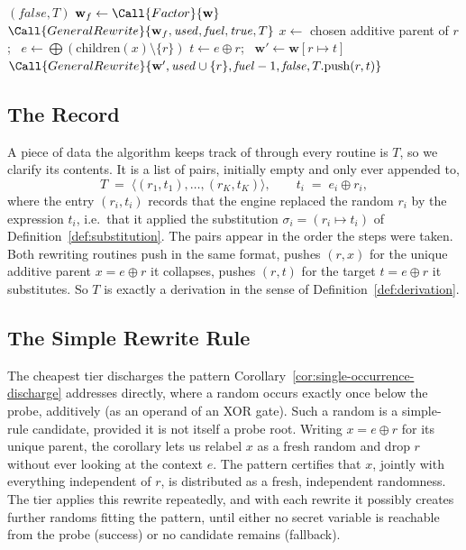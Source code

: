 \begin{algorithm}
\begin{minipage}{\linewidth}
\begin{algorithmic}[1]
     \Return $(\mathit{false}, T)$ \EndIf
    \State $\mathbf{w}_f \gets \Call{Factor}{\mathbf{w}}$ 
    \State \Return $\Call{GeneralRewrite}{\mathbf{w}_f, \mathit{used}, \mathit{fuel}, \mathit{true}, T}$
  \EndIf
  \State $x \gets$ chosen additive parent of $r$; \ $e \gets \bigoplus(\mathrm{children}(x) \setminus \{r\})$ 
  \State $t \gets e \oplus r$; \ $\mathbf{w}' \gets \mathbf{w}[r \mapsto t]$ 
  \State \Return $\Call{GeneralRewrite}{\mathbf{w}', \mathit{used} \cup \{r\}, \mathit{fuel}-1, \mathit{false}, T.\mathrm{push}(r,t)}$
\EndFunction
\end{algorithmic}
\end{minipage}
\end{algorithm}

  \subsection{The Record }
  \label{sec:record-T}

  A piece of data the algorithm keeps track of through every routine is $T$, so we
  clarify its contents. It is a list of pairs, initially empty and only ever
  appended to,
  \[
    T \;=\; \big\langle (r_1, t_1), \dots, (r_K, t_K) \big\rangle ,
    \qquad t_i \;=\; e_i \oplus r_i ,
  \]
  where the entry $(r_i, t_i)$ records that the engine replaced the random $r_i$ by
  the expression $t_i$, i.e.\ that it applied the substitution
  $\sigma_i = (r_i \mapsto t_i)$ of Definition~\ref{def:substitution}. The pairs
  appear in the order the steps were taken. Both rewriting routines push in the
  same format,  pushes $(r, x)$ for the unique additive
  parent $x = e \oplus r$ it collapses,  pushes $(r, t)$
  for the target $t = e \oplus r$ it substitutes.
  So $T$ is exactly a derivation in the sense of Definition~\ref{def:derivation}.

  \subsection{The Simple Rewrite Rule}
  \label{sec:simple-rule}

  The cheapest tier discharges the pattern
  Corollary~\ref{cor:single-occurrence-discharge} addresses directly, where a random
  occurs exactly once below the probe, additively (as an operand of an XOR gate).
  Such a random is a simple-rule candidate, provided it is not itself a probe
  root. Writing $x = e \oplus r$ for its unique parent, the corollary lets us relabel
  $x$ as a fresh random and drop $r$ without ever looking at the context $e$. The
  pattern certifies that $x$, jointly with everything independent of $r$, is
  distributed as a fresh, independent randomness. The tier applies this rewrite
  repeatedly, and with each rewrite it possibly creates further randoms fitting the pattern,
  until either no secret variable is reachable from the probe (success) or no candidate
  remains (fallback).

